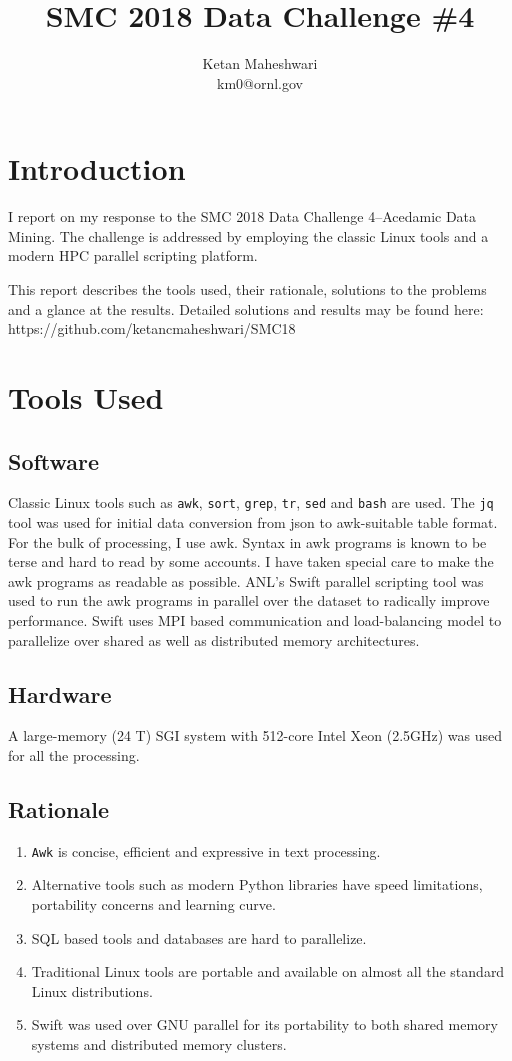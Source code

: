 \documentclass{report}
\title{SMC 2018 Data Challenge \#4}
\author{Ketan Maheshwari\\ km0@ornl.gov}
\begin{document}
\maketitle
\section*{Introduction}

I report on my response to the SMC 2018 Data Challenge 4--Acedamic Data Mining.
The challenge is addressed by employing the classic Linux tools and a modern HPC
parallel scripting platform.

This report describes the tools used, their rationale, solutions to the
problems and a glance at the results. Detailed solutions and results may be
found here: https://github.com/ketancmaheshwari/SMC18

\section*{Tools Used}
\subsection*{Software}
Classic Linux tools such as \texttt{awk}, \texttt{sort}, \texttt{grep},
\texttt{tr}, \texttt{sed} and \texttt{bash} are used.  The \texttt{jq} tool was
used for initial data conversion from json to awk-suitable table format. For
the bulk of processing, I use awk. Syntax in awk programs is known to be terse
and hard to read by some accounts. I have taken special care to make the awk
programs as readable as possible.  ANL's Swift parallel scripting tool was used
to run the awk programs in parallel over the dataset to radically improve
performance. Swift uses MPI based communication and load-balancing model to
parallelize over shared as well as distributed memory architectures.

\subsection*{Hardware}
A large-memory (24 T) SGI system with 512-core Intel Xeon (2.5GHz) was used for
all the processing.

\subsection*{Rationale}
\begin{enumerate}
\item \texttt{Awk} is concise, efficient and expressive in text processing.
\item Alternative tools such as modern Python libraries have speed limitations, portability concerns and learning curve.
\item SQL based tools and databases are hard to parallelize.
\item Traditional Linux tools are portable and available on almost all the standard Linux distributions.
\item Swift was used over GNU parallel for its portability to both shared memory systems and distributed memory clusters.
\end{enumerate}
\end{document}
